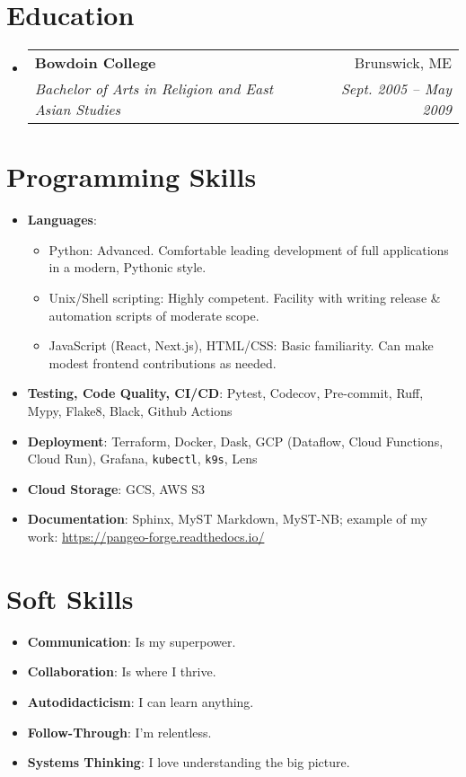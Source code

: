 \documentclass[letterpaper,11pt]{article}
\makeatletter
\newcommand{\resumeItem}[2]{
  \item[]\small{
    \textbf{#1}{: #2 \vspace{-2pt}}
  }
}
\newcommand{\resumeSubheadingEducation}[4]{
  \vspace{-0.5pt}\item[]
    \begin{tabular*}{0.999\textwidth}[t]{l@{\extracolsep{\fill}}r}
      \textbf{#1} & #2 \\
      \textit{\small#3} & \textit{\small #4} \\
    \end{tabular*}\vspace{0pt}
}
\newcommand{\resumeSubItem}[2]{\resumeItem{#1}{#2}\vspace{-4pt}}
\newcommand{\resumeSubHeadingListStart}{\begin{itemize}[leftmargin=1pt]}
\newcommand{\resumeSubHeadingListEnd}{\end{itemize}}
\makeatother
\begin{document}
\section{Education}
\resumeSubHeadingListStart
  \resumeSubheadingEducation
    {Bowdoin College}{Brunswick, ME}
    {Bachelor of Arts in Religion and East Asian Studies}{Sept. 2005 -- May 2009}
\resumeSubHeadingListEnd

\section{Programming Skills}
  \resumeSubHeadingListStart
    \resumeSubItem{Languages}
      {}
      \begin{itemize}
      \item Python: Advanced. Comfortable leading development of full applications in a modern, Pythonic style.
      \item Unix/Shell scripting: Highly competent. Facility with writing release \& automation scripts of moderate scope.
      \item JavaScript (React, Next.js), HTML/CSS: Basic familiarity. Can make modest frontend contributions as needed.
      \end{itemize}
    \resumeSubItem{Testing, Code Quality, CI/CD}
      {Pytest, Codecov, Pre-commit, Ruff, Mypy, Flake8, Black, Github Actions}
    \resumeSubItem{Deployment}
      {Terraform, Docker, Dask, GCP (Dataflow, Cloud Functions, Cloud Run), Grafana, \texttt{kubectl}, \texttt{k9s}, Lens}
    \resumeSubItem{Cloud Storage}
      {GCS, AWS S3}
    \resumeSubItem{Documentation}
      {Sphinx, MyST Markdown, MyST-NB; example of my work: \href{https://pangeo-forge.readthedocs.io/}{https://pangeo-forge.readthedocs.io/}}
  \resumeSubHeadingListEnd

\vspace{1.5pt}

\section{Soft Skills}
  \resumeSubHeadingListStart
  \resumeSubItem{Communication}
   {Is my superpower.}
  \resumeSubItem{Collaboration}
   {Is where I thrive.}
  \resumeSubItem{Autodidacticism}
   {I can learn anything.}
  \resumeSubItem{Follow-Through}
   {I'm relentless.}
  \resumeSubItem{Systems Thinking}
   {I love understanding the big picture.}
  \resumeSubHeadingListEnd
\end{document}

